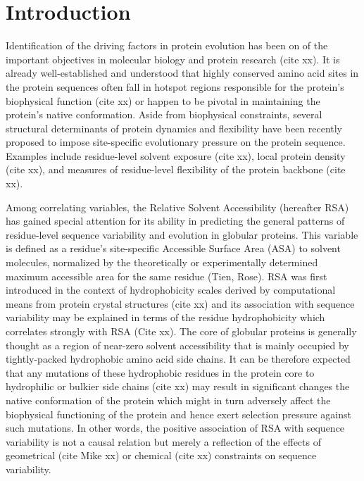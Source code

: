 \documentclass[12pt]{article}
\begin{document}
\section*{Introduction}

Identification of the driving factors in protein evolution has been on of the important objectives in molecular biology and protein research (cite xx). It is already well-established and understood that highly conserved amino acid sites in the protein sequences often fall in hotspot regions responsible for the protein's biophysical function (cite xx) or happen to be pivotal in maintaining the protein's native conformation. Aside from biophysical constraints, several structural determinants of protein dynamics and flexibility have been recently proposed to impose site-specific evolutionary pressure on the protein sequence. Examples include residue-level solvent exposure (cite xx), local protein density (cite xx), and measures of residue-level flexibility of the protein backbone (cite xx).

Among correlating variables, the Relative Solvent Accessibility (hereafter RSA) has gained special attention for its ability in predicting the general patterns of residue-level sequence variability and evolution in globular proteins. This variable is defined as a residue's site-specific Accessible Surface Area (ASA) to solvent molecules, normalized by the theoretically or experimentally determined maximum accessible area for the same residue (Tien, Rose). RSA was first introduced in the context of hydrophobicity scales derived by computational means from protein crystal structures (cite xx) and its association with sequence variability may be explained in terms of the residue hydrophobicity which correlates strongly with RSA (Cite xx). The core of globular proteins is generally thought as a region of near-zero solvent accessibility that is mainly occupied by tightly-packed hydrophobic amino acid side chains. It can be therefore expected that any mutations of these hydrophobic residues in the protein core to hydrophilic or bulkier side chains (cite xx) may result in significant changes the native conformation of the protein which might in turn adversely affect the biophysical functioning of the protein and hence exert selection pressure against such mutations. In other words, the positive association of RSA with sequence variability is not a causal relation but merely a reflection of the effects of geometrical (cite Mike xx) or chemical (cite xx) constraints on sequence variability.
\end{document}

